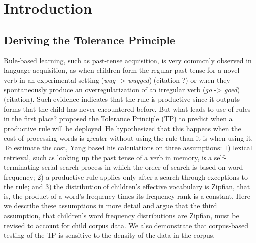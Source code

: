 \section{Introduction}
\vspace{-1em}

\subsection{Deriving the Tolerance Principle}
\indent 

Rule-based learning, such as past-tense acquisition, is very commonly observed in language acquisition, as when children form the regular past tense for a novel verb in an experimental setting (\textit{wug} -> \textit{wugged}) (citation ?) or when they spontaneously produce an overregularization of an irregular verb (\textit{go} -> \textit{goed}) (citation). Such evidence indicates that the rule is productive since it outputs forms that the child has never encountered before. But what leads to use of rules in the first place? \citep{yang2016price} proposed the Tolerance Principle (TP) to predict when a productive rule will be deployed. He hypothesized that this happens when the cost of processing words is greater without using the rule than it is when using it. To estimate the cost, Yang based his calculations on three assumptions: 1) lexical retrieval, such as looking up the past tense of a verb in memory, is a self-terminating serial search process in which the order of search is based on word frequency; 2) a productive rule applies only after a search through exceptions to the rule; and 3) the distribution of children's effective vocabulary is Zipfian, that is, the product of a word's frequency times its frequency rank is a constant. Here we describe these assumptions in more detail and argue that the third assumption, that children's word frequency distributions are Zipfian, must be revised to account for child corpus data. We also demonstrate that corpus-based testing of the TP is sensitive to the density of the data in the corpus.


